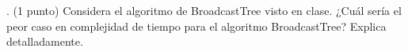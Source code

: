 . (1 punto) Considera el algoritmo de BroadcastTree visto en clase. ¿Cuál sería el peor caso en complejidad de tiempo para el algoritmo BroadcastTree? Explica detalladamente.  

